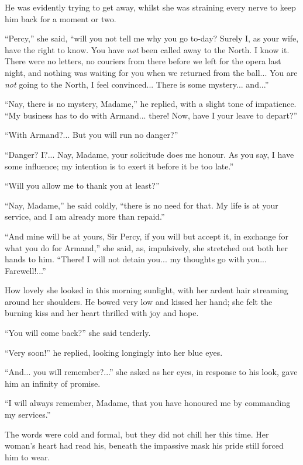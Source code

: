 He was evidently trying to get away, whilst she was straining every nerve to keep him back for a moment or two.

\enquote{Percy,} she said, \enquote{will you not tell me why you go to-day? Surely I, as your wife, have the right to know. You have \textit{not} been called away to the North. I know it. There were no letters, no couriers from there before we left for the opera last night, and nothing was waiting for you when we returned from the ball... You are \textit{not} going to the North, I feel convinced... There is some mystery... and...}

\enquote{Nay, there is no mystery, Madame,} he replied, with a slight tone of impatience. \enquote{My business has to do with Armand... there! Now, have I your leave to depart?}

\enquote{With Armand?... But you will run no danger?}

\enquote{Danger? I?... Nay, Madame, your solicitude does me honour. As you say, I have some influence; my intention is to exert it before it be too late.}

\enquote{Will you allow me to thank you at least?}

\enquote{Nay, Madame,} he said coldly, \enquote{there is no need for that. My life is at your service, and I am already more than repaid.}

\enquote{And mine will be at yours, Sir Percy, if you will but accept it, in exchange for what you do for Armand,} she said, as, impulsively, she stretched out both her hands to him. \enquote{There! I will not detain you... my thoughts go with you... Farewell!...}

How lovely she looked in this morning sunlight, with her ardent hair streaming around her shoulders. He bowed very low and kissed her hand; she felt the burning kiss and her heart thrilled with joy and hope.

\enquote{You will come back?} she said tenderly.

\enquote{Very soon!} he replied, looking longingly into her blue eyes.

\enquote{And... you will remember?...} she asked as her eyes, in response to his look, gave him an infinity of promise.

\enquote{I will always remember, Madame, that you have honoured me by commanding my services.}

The words were cold and formal, but they did not chill her this time. Her woman's heart had read his, beneath the impassive mask his pride still forced him to wear.

